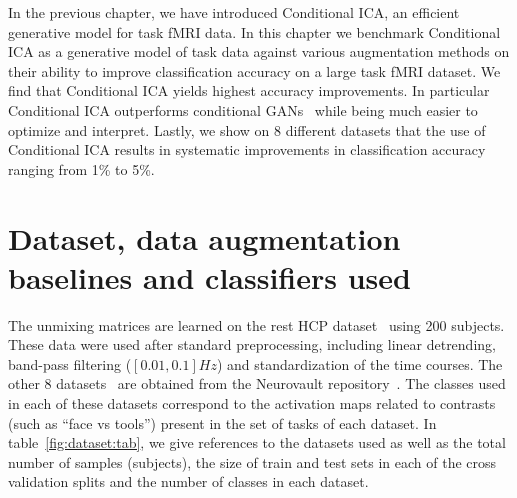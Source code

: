 In the previous chapter, we have introduced Conditional ICA, an efficient generative
model for task fMRI data.
% 
In this chapter we benchmark Conditional ICA as a generative model of task data against
various augmentation methods  on their
ability to improve classification accuracy on a large task fMRI dataset.
We find that Conditional ICA yields highest accuracy improvements.
In particular Conditional ICA outperforms conditional GANs~\cite{mirza2014conditional} while being much easier to optimize and interpret. 
Lastly, we show on 8 different datasets that the use of Conditional ICA results in systematic improvements in classification accuracy ranging from 1\% to 5\%.

\section{Dataset, data augmentation baselines and classifiers used}
\label{sec:condica:datasets}
The unmixing matrices are learned on the rest HCP
dataset~\cite{van2013wu} using 200 subjects.
These data were used after standard
preprocessing, including linear detrending, band-pass filtering
($[0.01, 0.1]Hz$) and standardization of the time courses.
The other 8 datasets~\cite{van2013wu, shafto2014cambridge,
  orfanos2017brainomics, pinel2019functional, pinel2007fast, pinel2013genetic,
  poldrack2016phenome, pinel2013genetic} are obtained from the Neurovault repository~\cite{gorgolewski2015neurovault}.
The classes used in each of these datasets correspond to the activation maps
related to contrasts (such as ``face vs tools'')
present in the set of tasks of each dataset. In table~\ref{fig:dataset:tab}, we
give references to the datasets used as well as the total number of samples
(subjects), the size of train and test sets in each of the cross validation
splits and the number of classes in each dataset. 

